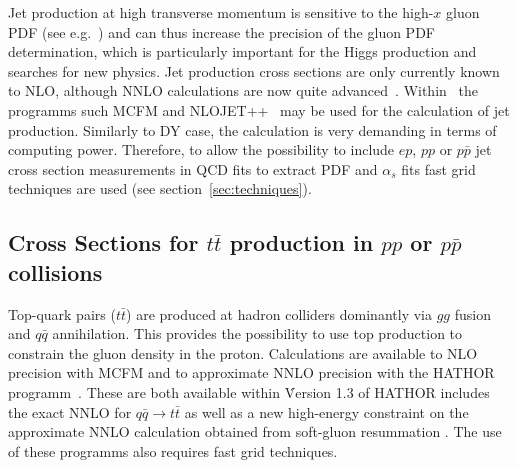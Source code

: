 Jet production at high transverse momentum is sensitive to the high-$x$ gluon 
PDF (see e.g.~\cite{MSTWpdf}) and can thus increase the precision of the 
gluon PDF determination, which is particularly important for the Higgs production and searches for new physics.
Jet production cross sections are only currently known to NLO, although NNLO 
calculations are now quite advanced~\cite{nigel:2013,nigel:2010}. 
Within \fitter\ the programms such MCFM and 
NLOJET++~\cite{Nagy:1998bb,Nagy:2001fj} may be used for the 
calculation of jet production.
Similarly to DY case, the calculation 
is very demanding in terms of computing power. 
Therefore, to allow the possibility to include  $ep$, $pp$ or $p\bar p$ 
jet cross section 
measurements in QCD fits to extract PDF and $\alpha_s$ fits fast 
grid techniques are used (see section~\ref{sec:techniques}).




\subsection{Cross Sections for \texorpdfstring{$t\bar{t}$}{t-tbar} production in $pp$ or $p\bar p$ collisions}
%
Top-quark pairs ($t\bar{t}$) are produced at hadron colliders dominantly 
via $gg$ fusion and
$q \bar q$ annihilation. This provides the possibility to use top production to
constrain the gluon density in the proton. Calculations are available to NLO precision with  MCFM and to approximate NNLO precision with the HATHOR programm~\cite{Aliev:2010zk}. These are both available within \fitter\. 
Version 1.3 of HATHOR includes the exact NNLO for $q \bar q \to t \bar t$ \cite{Baernreuther:2012ws}
as well as a new high-energy constraint on the 
approximate NNLO calculation obtained from
soft-gluon resummation \cite{Moch:2012mk}.
The use of these programms also requires fast grid techniques.




